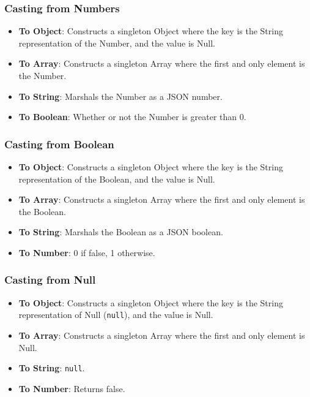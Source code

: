 \subsubsection{Casting from Numbers}

\begin{itemize}
    \item \textbf{To Object}: Constructs a singleton Object where the key is the String representation of the Number, and the value is Null.
    \item \textbf{To Array}: Constructs a singleton Array where the first and only element is the Number.
    \item \textbf{To String}: Marshals the Number as a JSON number.
    \item \textbf{To Boolean}: Whether or not the Number is greater than 0.
\end{itemize}

\subsubsection{Casting from Boolean}

\begin{itemize}
    \item \textbf{To Object}: Constructs a singleton Object where the key is the String representation of the Boolean, and the value is Null.
    \item \textbf{To Array}: Constructs a singleton Array where the first and only element is the Boolean.
    \item \textbf{To String}: Marshals the Boolean as a JSON boolean.
    \item \textbf{To Number}: 0 if false, 1 otherwise.
\end{itemize}

\subsubsection{Casting from Null}

\begin{itemize}
    \item \textbf{To Object}: Constructs a singleton Object where the key is the String representation of Null (\verb|null|), and the value is Null.
    \item \textbf{To Array}: Constructs a singleton Array where the first and only element is Null.
    \item \textbf{To String}: \verb|null|.
    \item \textbf{To Number}: Returns false.
\end{itemize}

